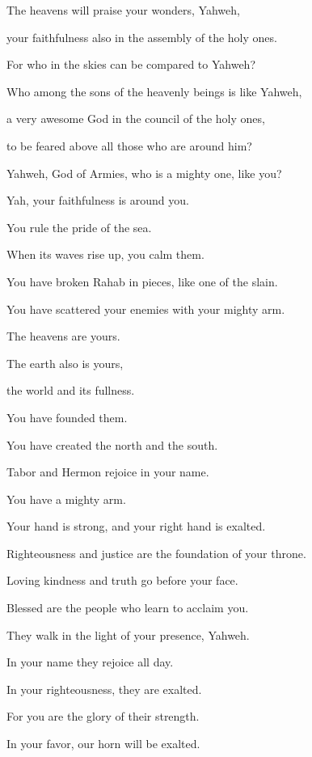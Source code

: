 {\Q {}The heavens will praise your wonders, Yahweh,
\par }{\QB your faithfulness also in the assembly of the holy ones.
\par }{\Q {}For who in the skies can be compared to Yahweh?
\par }{\QB Who among the sons of the heavenly beings is like Yahweh,
\par }{\Q {}a very awesome God in the council of the holy ones,
\par }{\QB to be feared above all those who are around him?
\par }{\Q {}Yahweh, God of Armies, who is a mighty one, like you?
\par }{\QB Yah, your faithfulness is around you.
\par }{\Q {}You rule the pride of the sea.
\par }{\QB When its waves rise up, you calm them.
\par }{\Q {}You have broken Rahab in pieces, like one of the slain.
\par }{\QB You have scattered your enemies with your mighty arm.
\par }{\Q {}The heavens are yours.
\par }{\QB The earth also is yours,
\par }{\QB the world and its fullness.
\par }{\QB You have founded them.
\par }{\Q {}You have created the north and the south.
\par }{\QB Tabor and Hermon rejoice in your name.
\par }{\Q {}You have a mighty arm.
\par }{\QB Your hand is strong, and your right hand is exalted.
\par }{\Q {}Righteousness and justice are the foundation of your throne.
\par }{\QB Loving kindness and truth go before your face.
\par }{\Q {}Blessed are the people who learn to acclaim you.
\par }{\QB They walk in the light of your presence, Yahweh.
\par }{\Q {}In your name they rejoice all day.
\par }{\QB In your righteousness, they are exalted.
\par }{\Q {}For you are the glory of their strength.
\par }{\QB In your favor, our horn will be exalted.
}
